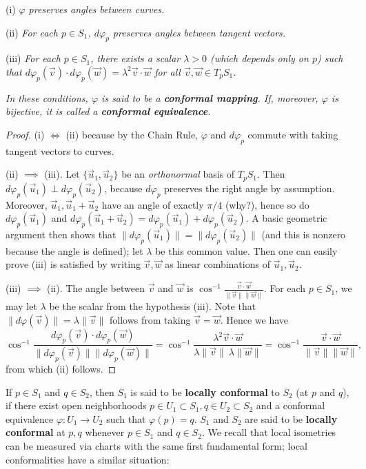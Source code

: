 \documentclass[leqno]{book}
\begin{document}
(i) \emph{$\varphi$ preserves angles between curves.}

(ii) \emph{For each $p\in S_1$, $d\varphi_p$ preserves angles between tangent vectors.}

(iii) \emph{For each $p\in S_1$, there exists a scalar $\lambda>0$ (which depends only on $p$) such that $d\varphi_p(\vec v)\cdot d\varphi_p(\vec w)=\lambda^2\vec v\cdot\vec w$ for all $\vec v,\vec w\in T_pS_1$.}

\emph{In these conditions, $\varphi$ is said to be a \textbf{conformal mapping}.  If, moreover, $\varphi$ is bijective, it is called a \textbf{conformal equivalence}.}
\begin{proof}
(i) $\iff$ (ii) because by the Chain Rule, $\varphi$ and $d\varphi_p$ commute with taking tangent vectors to curves.

(ii) $\implies$ (iii). Let $\{\vec u_1,\vec u_2\}$ be an \emph{orthonormal} basis of $T_pS_1$.  Then $d\varphi_p(\vec u_1)\perp d\varphi_p(\vec u_2)$, because $d\varphi_p$ preserves the right angle by assumption.  Moreover, $\vec u_1,\vec u_1+\vec u_2$ have an angle of exactly $\pi/4$ (why?), hence so do $d\varphi_p(\vec u_1)$ and $d\varphi_p(\vec u_1+\vec u_2)=d\varphi_p(\vec u_1)+d\varphi_p(\vec u_2)$.  A basic geometric argument then shows that $\|d\varphi_p(\vec u_1)\|=\|d\varphi_p(\vec u_2)\|$ (and this is nonzero because the angle is defined); let $\lambda$ be this common value.  Then one can easily prove (iii) is satisfied by writing $\vec v,\vec w$ as linear combinations of $\vec u_1,\vec u_2$.

(iii) $\implies$ (ii). The angle between $\vec v$ and $\vec w$ is $\cos^{-1}\frac{\vec v\cdot\vec w}{\|\vec v\|\|\vec w\|}$.  For each $p\in S_1$, we may let $\lambda$ be the scalar from the hypothesis (iii).  Note that $\|d\varphi(\vec v)\|=\lambda\|\vec v\|$ follows from taking $\vec v=\vec w$.  Hence we have
$$\cos^{-1}\frac{d\varphi_p(\vec v)\cdot d\varphi_p(\vec w)}{\|d\varphi_p(\vec v)\|\|d\varphi_p(\vec w)\|}=\cos^{-1}\frac{\lambda^2\vec v\cdot\vec w}{\lambda\|\vec v\|~\lambda\|\vec w\|}=\cos^{-1}\frac{\vec v\cdot\vec w}{\|\vec v\|\|\vec w\|},$$
from which (ii) follows.
\end{proof}

\noindent If $p\in S_1$ and $q\in S_2$, then $S_1$ is said to be \textbf{locally conformal} to $S_2$ (at $p$ and $q$), if there exist open neighborhoods $p\in U_1\subset S_1,q\in U_2\subset S_2$ and a conformal equivalence $\varphi:U_1\to U_2$ such that $\varphi(p)=q$.  $S_1$ and $S_2$ are said to be \textbf{locally conformal} at $p,q$ whenever $p\in S_1$ and $q\in S_2$. %
We recall that local isometries can be measured via charts with the same first fundamental form; local conformalities have a similar situation:\\
\end{document}
